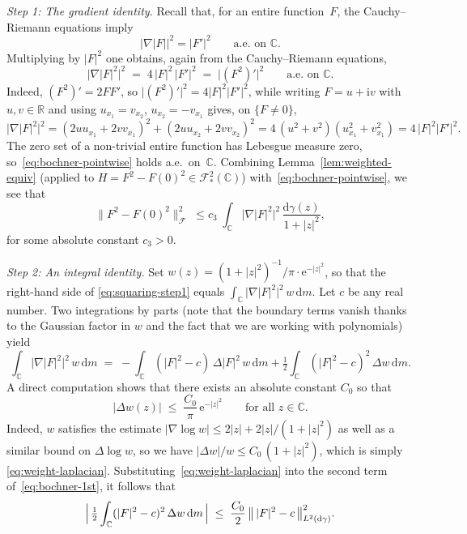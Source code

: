 \documentclass[a4paper,11pt,reqno]{amsart}
\numberwithin{equation}{section}
\theoremstyle{plain} %
\theoremstyle{definition} %
\theoremstyle{remark}
\newcommand{\C}{\mathbb{C}}
\newcommand{\abs}[1]{\lvert #1 \rvert}
\newcommand{\norm}[1]{\lVert #1 \rVert}
\newcommand{\dd}{\mathrm{d}}
\newcommand{\ee}{\mathrm{e}}
\newcommand{\ii}{\mathrm{i}}
\begin{document}
\medskip
\noindent\emph{Step 1: The gradient identity.}\;
Recall that, for an entire function~$F$, the Cauchy--Riemann equations imply
\begin{equation}\label{eq:fnt-nabla-mod}
\abs{\nabla \abs{F}}^2 = \abs{F'}^2 \qquad \text{a.e.\ on } \C.
\end{equation}
Multiplying by
$\abs{F}^2$ one obtains, again from the Cauchy--Riemann
equations,
\begin{equation}\label{eq:bochner-pointwise}
\abs{\nabla \abs{F}^2}^2
\;=\;
4\, \abs{F}^2\, \abs{F'}^2
\;=\;
\abs{(F^2)'}^2
\qquad\text{a.e.\ on } \C.
\end{equation}
Indeed, $(F^2)' = 2F F'$, so $\abs{(F^2)'}^2 = 4\abs{F}^2 \abs{F'}^2$, while
writing $F = u + \ii v$ with $u,v \in \mathbb{R}$ and using
$u_{x_1} = v_{x_2}$, $u_{x_2} = -v_{x_1}$ gives, on $\{F \neq 0\}$,
\[
\abs{\nabla \abs{F}^2}^2
= (2 u u_{x_1} + 2 v v_{x_1})^2
+ (2 u u_{x_2} + 2 v v_{x_2})^2
= 4\,(u^2+v^2)(u_{x_1}^2 + v_{x_1}^2)
= 4\,\abs{F}^2 \abs{F'}^2.
\]
The zero set of a non-trivial entire function has Lebesgue measure zero,
so~\eqref{eq:bochner-pointwise} holds a.e.\ on~$\C$. Combining
Lemma~\ref{lem:weighted-equiv} (applied to $H = F^2 - F(0)^2 \in
\mathcal{F}^2_\ast(\C)$) with~\eqref{eq:bochner-pointwise}, we see that
\begin{equation}\label{eq:squaring-step1}
\norm{F^2 - F(0)^2}_{\mathcal{F}}^2
\;\le c_3\;
\int_{\C} \abs{\nabla \abs{F}^2}^2\, \frac{\dd\gamma(z)}{1+\abs{z}^2},
\end{equation}
for some absolute constant $c_3 > 0.$

\medskip

\noindent\emph{Step 2: An integral identity.}\;
Set $w(z) = (1+\abs{z}^2)^{-1}/\pi \cdot \ee^{-\abs{z}^2}$, so that the
right-hand side of \eqref{eq:squaring-step1} equals
$\int_{\C}\abs{\nabla\abs{F}^2}^2\, w\,\dd m$. Let $c$ be any real number. Two integrations by parts (note that the boundary terms vanish thanks to the Gaussian
factor in $w$ and the fact that we are working with polynomials) yield
\begin{equation}\label{eq:bochner-1st}
\int_{\C} \abs{\nabla \abs{F}^2}^2\, w\, \dd m
\;=\;
-\int_{\C} (\abs{F}^2 - c)\, \Delta\abs{F}^2\, w\, \dd m
+ \tfrac{1}{2} \int_{\C} (\abs{F}^2 - c)^2\, \Delta w\, \dd m.
\end{equation}
A direct computation shows that there exists an absolute constant $C_0$
so that
\begin{equation}\label{eq:weight-laplacian}
\abs{\Delta w(z)}
\;\le\;
\frac{C_0}{\pi}\, \ee^{-\abs{z}^2}
\qquad\text{for all } z \in \C.
\end{equation}
Indeed, $w$ satisfies the estimate
$\abs{\nabla \log w} \le 2\abs{z} + 2\abs{z}/(1+\abs{z}^2)$ as well as a similar
bound on $\Delta\log w$, so we have
$\abs{\Delta w}/w \le C_0\,(1 + \abs{z}^2)$, which is simply
\eqref{eq:weight-laplacian}.
Substituting~\eqref{eq:weight-laplacian} into the second term
of~\eqref{eq:bochner-1st}, it follows that
\begin{equation}\label{eq:bochner-1st-2nd-term}
\Bigl|\, \tfrac{1}{2}\int_{\C} (\abs{F}^2 - c)^2\, \Delta w\, \dd m \,\Bigr|
\;\le\;
\frac{C_0}{2}\, \bigl\|\, \abs{F}^2 - c \,\bigr\|_{L^2(\dd\gamma)}^2.
\end{equation}
\end{document}

